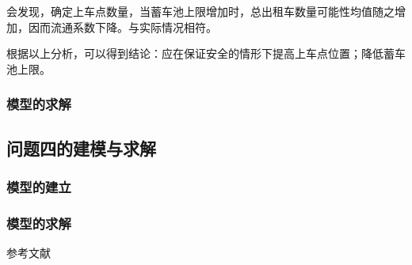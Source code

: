 \documentclass[withoutpreface,bwprint]{cumcmthesis} %
\begin{document}
会发现，确定上车点数量，当蓄车池上限增加时，总出租车数量可能性均值随之增加，因而流通系数下降。与实际情况相符。

根据以上分析，可以得到结论：应在保证安全的情形下提高上车点位置；降低蓄车池上限。

\subsubsection{模型的求解}



\newpage
\subsection{问题四的建模与求解}
\subsubsection{模型的建立}


\subsubsection{模型的求解}

\newpage
\begin{thebibliography}{9} %
	 参考文献
\end{thebibliography}
\end{document}
